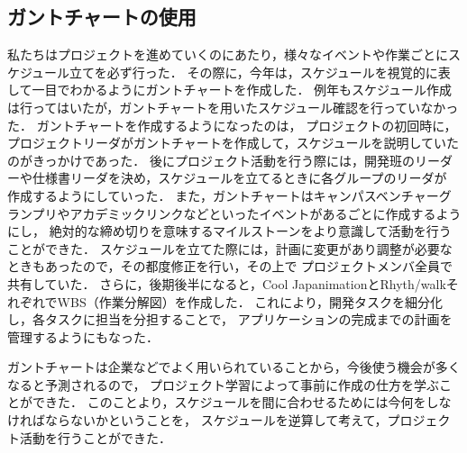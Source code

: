 \subsection{ガントチャートの使用}
\par
私たちはプロジェクトを進めていくのにあたり，様々なイベントや作業ごとにスケジュール立てを必ず行った．
その際に，今年は，スケジュールを視覚的に表して一目でわかるようにガントチャートを作成した．
例年もスケジュール作成は行ってはいたが，ガントチャートを用いたスケジュール確認を行っていなかった．
ガントチャートを作成するようになったのは，
プロジェクトの初回時に，プロジェクトリーダがガントチャートを作成して，スケジュールを説明していたのがきっかけであった．
後にプロジェクト活動を行う際には，開発班のリーダーや仕様書リーダを決め，スケジュールを立てるときに各グループのリーダが
作成するようにしていった．
また，ガントチャートはキャンパスベンチャーグランプリやアカデミックリンクなどといったイベントがあるごとに作成するようにし，
絶対的な締め切りを意味するマイルストーンをより意識して活動を行うことができた．
スケジュールを立てた際には，計画に変更があり調整が必要なときもあったので，その都度修正を行い，その上で
プロジェクトメンバ全員で共有していた．
さらに，後期後半になると，Cool JapanimationとRhyth/walkそれぞれでWBS（作業分解図）を作成した．
これにより，開発タスクを細分化し，各タスクに担当を分担することで，
アプリケーションの完成までの計画を管理するようにもなった．
\par
ガントチャートは企業などでよく用いられていることから，今後使う機会が多くなると予測されるので，
プロジェクト学習によって事前に作成の仕方を学ぶことができた．
このことより，スケジュールを間に合わせるためには今何をしなければならないかということを，
スケジュールを逆算して考えて，プロジェクト活動を行うことができた．
